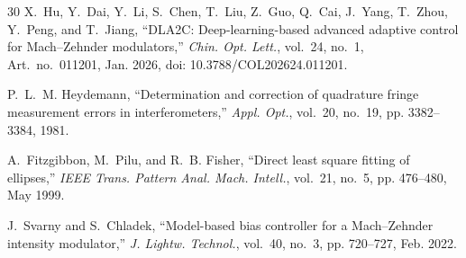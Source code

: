 \documentclass[journal]{IEEEtran}
\theoremstyle{plain}
\theoremstyle{remark}
\begin{document}
\begin{thebibliography}{30}
X.~Hu, Y.~Dai, Y.~Li, S.~Chen, T.~Liu, Z.~Guo, Q.~Cai, J.~Yang,
T.~Zhou, Y.~Peng, and T.~Jiang, ``{DLA2C}: Deep-learning-based advanced
adaptive control for {Mach--Zehnder} modulators,'' \emph{Chin. Opt. Lett.},
vol.~24, no.~1, Art.~no.~011201, Jan. 2026,
doi: 10.3788/COL202624.011201.

P.~L.~M. Heydemann, ``Determination and correction of quadrature fringe
measurement errors in interferometers,'' \emph{Appl. Opt.}, vol.~20,
no.~19, pp. 3382--3384, 1981.

A.~Fitzgibbon, M.~Pilu, and R.~B. Fisher, ``Direct least square fitting
of ellipses,'' \emph{IEEE Trans. Pattern Anal. Mach. Intell.}, vol.~21,
no.~5, pp. 476--480, May 1999.

J.~Svarny and S.~Chladek, ``Model-based bias controller for a
{Mach--Zehnder} intensity modulator,'' \emph{J. Lightw. Technol.},
vol.~40, no.~3, pp. 720--727, Feb. 2022.

\end{thebibliography}
\end{document}
